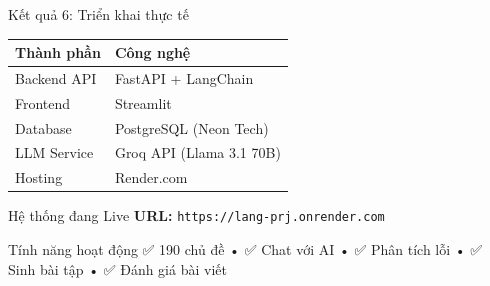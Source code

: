 \documentclass[notheorems,hyperref={bookmarks=true}]{beamer}
\begin{document}
\begin{frame}{Kết quả 6: Triển khai thực tế}
\begin{table}
    \centering
    \small
    \begin{tabular}{|l|l|}
        \hline
        \rowcolor{blue!20} \textbf{Thành phần} & \textbf{Công nghệ} \\
        \hline
        Backend API & FastAPI + LangChain \\
        \hline
        Frontend & Streamlit \\
        \hline
        Database & PostgreSQL (Neon Tech) \\
        \hline
        LLM Service & Groq API (Llama 3.1 70B) \\
        \hline
        Hosting & Render.com \\
        \hline
    \end{tabular}
\end{table}

\vspace{0.5cm}

\begin{exampleblock}{Hệ thống đang Live}
    \centering
    \textbf{URL:} \texttt{https://lang-prj.onrender.com}
\end{exampleblock}

\begin{block}{Tính năng hoạt động}
    ✅ 190 chủ đề • ✅ Chat với AI • ✅ Phân tích lỗi • ✅ Sinh bài tập • ✅ Đánh giá bài viết
\end{block}
\end{frame}
\end{document}
